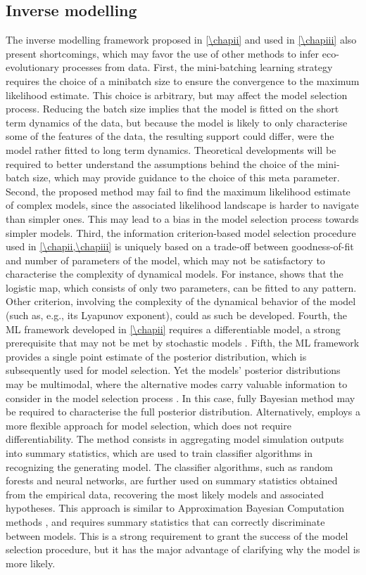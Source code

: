 \subsection{Inverse modelling}
The inverse modelling framework proposed in \cref{\chapii} and used in \cref{\chapiii} also present shortcomings, which may favor the use of other methods to infer eco-evolutionary processes from data.
%
First, the mini-batching learning strategy requires the choice of a minibatch size to ensure the convergence to the maximum likelihood estimate. This choice is arbitrary, but may affect the model selection process.
Reducing the batch size implies that the model is fitted on the short term dynamics of the data, but because the model is likely to only characterise some of the features of the data, the resulting support could differ, were the model rather fitted to long term dynamics. Theoretical developments will be required to better understand the assumptions behind the choice of the mini-batch size, which may provide guidance to the choice of this meta parameter. 
% 
Second, the proposed method may fail to find the maximum likelihood estimate of complex models, since the associated likelihood landscape is harder to navigate than simpler ones. This may lead to a bias in the model selection process towards simpler models.
% 
Third, the information criterion-based model selection procedure used in \cref{\chapii,\chapiii} is uniquely based on a trade-off between goodness-of-fit and number of parameters of the model, which may not be satisfactory to characterise the complexity of dynamical models. 
% 
For instance, \cite{XXX} shows that the logistic map, which consists of only two parameters, can be fitted to any pattern. Other criterion, involving the complexity of the dynamical behavior of the model (such as, e.g., its Lyapunov exponent), could as such be developed.
% 
Fourth, the ML framework developed in \cref{\chapii} requires a differentiable model, a strong prerequisite that may not be met by stochastic models \xxx. 
% 
Fifth, the ML framework provides a single point estimate of the posterior distribution, which is subsequently used for model selection. Yet the models' posterior distributions may be multimodal, where the alternative modes carry valuable information to consider in the model selection process \citep{Daniels2015}. In this case, fully Bayesian method may be required to characterise the full posterior distribution.
% 
Alternatively, \cite{Skeels2022} employs a more flexible approach for model selection, which does not require differentiability. The method consists in aggregating model simulation outputs into summary statistics, which are used to train classifier algorithms in recognizing the generating model. The classifier algorithms, such as random forests and neural networks, are further used on summary statistics obtained from the empirical data, recovering the most likely models and associated hypotheses. This approach is similar to Approximation Bayesian Computation methods \cite{Csillery2010}, and requires summary statistics that can correctly discriminate between models. This is a strong requirement to grant the success of the model selection procedure, but it has the major advantage of clarifying why the model is more likely.

